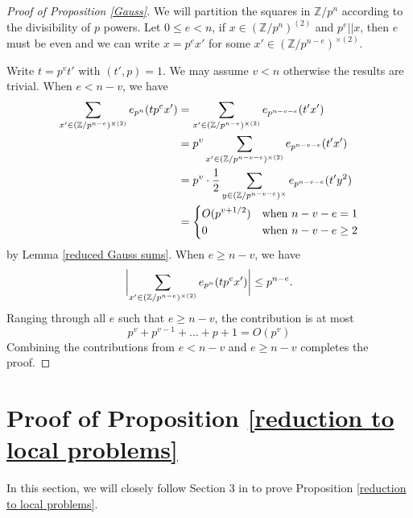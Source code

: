 \documentclass[11pt]{amsart}
\theoremstyle{plain} %
\theoremstyle{remark}
\numberwithin{equation}{section}
\newcommand{\Z}{\mathbb{Z}}
\DeclarePairedDelimiter\abs{\lvert}{\rvert}
\begin{document}
\begin{proof}[Proof of Proposition \ref{Gauss}]
    We will partition the squares in $\Z/p^n$ according to the divisibility of $p$ powers. Let $0\leq e< n$, if $x\in(\Z/p^n)^{(2)}$ and $p^e||x$, then $e$ must be even and we can write $x=p^ex'$ for some $x'\in(\Z/p^{n-e})^{\times(2)}$.

    Write $t=p^vt'$ with $(t',p)=1$. We may assume $v<n$ otherwise the results are trivial. When $e<n-v$, we have
    \begin{equation*}
    \begin{split}
        \sum_{x'\in(\Z/p^{n-e})^{\times(2)}}e_{p^n}(tp^ex')&=\sum_{x'\in(\Z/p^{n-e})^{\times(2)}}e_{p^{n-v-e}}(t'x')\\
        &=p^v\sum_{x'\in(\Z/p^{n-v-e})^{\times(2)}}e_{p^{n-v-e}}(t'x')\\
        &=p^v\cdot\frac{1}{2}\sum_{y\in(\Z/p^{n-v-e})^{\times}}e_{p^{n-v-e}}(t'y^2)\\
        &=\begin{dcases}
            O(p^{v+1/2})&\text{when $n-v-e=1$}\\
            0&\text{when $n-v-e\geq2$}
        \end{dcases}
    \end{split}        
    \end{equation*}
    by Lemma \ref{reduced Gauss sums}. When $e\geq n-v$, we have
    \begin{equation*}
        \abs[\bigg]{\sum_{x'\in(\Z/p^{n-e})^{\times(2)}}e_{p^n}(tp^ex')}\leq p^{n-e}.
    \end{equation*}
    Ranging through all $e$ such that $e\geq n-v$, the contribution is at most
    \begin{equation*}
        p^v+p^{v-1}+...+p+1=O(p^v)
    \end{equation*}
    Combining the contributions from $e<n-v$ and $e\geq n-v$ completes the proof.
\end{proof}

\section{Proof of Proposition \ref{reduction to local problems}}\label{appendix 1}

In this section, we will closely follow Section 3 in \cite{LiPan} to prove Proposition \ref{reduction to local problems}.
\end{document}
